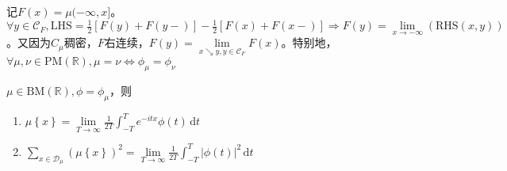 \documentclass{ctexart}
\begin{document}
\begin{Cor}
  记$F(x)= \mu(-\infty,x]$。$\forall y\in \mathcal{C}_F, \mathrm{LHS}= \frac{1}{2}\left[ F(y)+F(y-) \right]-\frac{1}{2}\left[ F(x)+F(x-) \right]\Rightarrow F(y)= \lim\limits_{x\to-\infty} (\mathrm{RHS}(x,y))$。又因为$C_{\mu}$稠密，$F$右连续，$F(y)=\lim\limits_{x\searrow y, y\in \mathcal{C}_F}F(x)$。特别地，$\forall \mu,\nu\in \mathrm{PM}(\mathbb{R}), \mu=\nu \Leftrightarrow \phi_{\mu}=\phi_{\nu}$
\end{Cor}

\begin{Cor}
  $\mu\in \mathrm{BM}(\mathbb{R}), \phi=\phi_{\mu}$，则
  
\begin{enumerate}
\item $\mu \left\{ x \right\}=\lim\limits_{T\to \infty} \frac{1}{2T}\int_{-T}^{T}e^{-itx}\phi(t) \,\mathrm{d}t$
\item $\sum\limits_{x\in \mathcal{D}_{\mu}}^{}(\mu \left\{ x \right\})^2 =\lim\limits_{T\to \infty}\frac{1}{2T}\int_{-T}^{T} |\phi(t)|^2\,\mathrm{d}t$
\end{enumerate}
  
\end{Cor}
\end{document}

